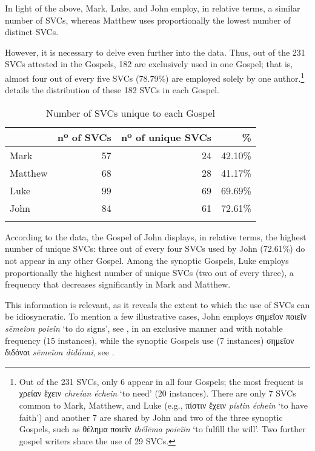 \documentclass[output=paper,colorlinks,citecolor=brown]{langscibook}
\begin{document}
In light of the above, Mark, Luke, and John employ, in relative terms, a similar number of
SVCs, whereas Matthew uses proportionally the lowest number of distinct SVCs.


\largerpage[-2]
However, it is necessary to delve even further into the data. Thus, out of the 231 SVCs
attested in the Gospels, 182 are exclusively used in one Gospel; that is, almost four out
of every five SVCs (78.79\%) are employed solely by one author.\footnote{Out of the 231
  SVCs, only 6 appear in all four Gospels; the most frequent is χρείαν ἔχειν
  \emph{chreían échein} `to need' (20 instances). There are only 7 SVCs common to Mark,
  Matthew, and Luke (e.g., πίστιν ἔχειν \emph{pístin échein} `to have faith') and another
  7 are shared by John and two of the three synoptic Gospels, such as θέλημα ποιεῖν
  \emph{thélēma poieîin} `to fulfill the will'. Two further gospel writers share the use
  of 29 SVCs.}  details the distribution of these 182 SVCs in
each Gospel.

\begin{table}
\caption{Number of SVCs unique to each Gospel}
\label{tbl:bj:uniqsvc}
\centering
\begin{tabularx}{.8\textwidth}{Xrrr}
\lsptoprule
 & nº of SVCs & nº of unique SVCs & \%\\
\midrule
Mark & 57 & 24 & 42.10\%\\
Matthew & 68 & 28 & 41.17\%\\
Luke & 99 & 69 & 69.69\%\\
John & 84 & 61 & 72.61\%\\
\lspbottomrule
\end{tabularx}
\end{table}

According to the data, the Gospel of John displays, in relative terms, the highest number
of unique SVCs: three out of every four SVCs used by John (72.61\%) do not appear in any
other Gospel. Among the synoptic Gospels, Luke employs proportionally the highest number
of unique SVCs (two out of every three), a frequency that decreases significantly in Mark
and Matthew.



This information is relevant, as it reveals the extent to which the use of SVCs can be
idiosyncratic. To mention a few illustrative cases, John employs σημεῖον ποιεῖν
\emph{sēmeîon poieîn} `to do signs', see , in an exclusive manner and with
notable frequency (15 instances), while the synoptic Gospels use (7 instances) σημεῖον
διδόναι \emph{sēmeîon didónai}, see . 
\end{document}
